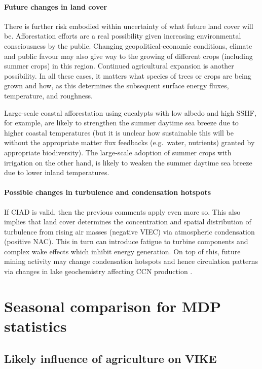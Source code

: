\paragraph{Future changes in land cover}

There is further risk embodied within uncertainty of what future land cover will be. Afforestation efforts are a real possibility given increasing environmental consciousness by the public. Changing geopolitical-economic conditions, climate and public favour may also give way to the growing of different crops (including summer crops) in this region. Continued agricultural expansion is another possibility. In all these cases, it matters what species of trees or crops are being grown and how, as this determines the subsequent surface energy fluxes, temperature, and roughness.

Large-scale coastal afforestation using eucalypts with low albedo and high \ac{SSHF}, for example, are likely to strengthen the summer daytime sea breeze due to higher coastal temperatures (but it is unclear how sustainable this will be without the appropriate matter flux feedbacks (e.g.\ water, nutrients) granted by appropriate biodiversity). The large-scale adoption of summer crops with irrigation on the other hand, is likely to weaken the summer daytime sea breeze due to lower inland temperatures.

\paragraph{Possible changes in turbulence and condensation hotspots}

If \ac{CIAD} is valid, then the previous comments apply even more so. This also implies that land cover determines the concentration and spatial distribution of turbulence from rising air masses (negative \ac{VIEC}) via atmospheric condensation (positive \ac{NAC}). This in turn can introduce fatigue to turbine components and complex wake effects which inhibit energy generation. On top of this, future mining activity may change condensation hotspots and hence circulation patterns via changes in lake geochemistry affecting \ac{CCN} production \citep{junkermann2009}.

\section{Seasonal comparison for MDP statistics}

\subsection{Likely influence of agriculture on VIKE}


